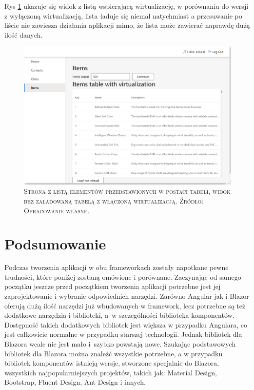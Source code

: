 \documentclass[12pt,a4paper,oneside]{book}
\newcommand{\captionT}[1]{\caption{\textsc{\footnotesize{#1}}}}
\begin{document}
Rys \ref{rys_app_blazor_list_virtual} ukazuje się widok z listą wspierającą wirtualizację, w porównaniu do wersji z wyłączoną wirtualizacją, lista ładuje się niemal natychmiast a przesuwanie po liście nie zawiesza działania aplikacji mimo, że lista może zawierać naprawdę dużą ilość danych.

\begin{figure}[H]
\centering
\includegraphics[width=1\textwidth]{images/BlazorApp/BlazorListaWirtualizacja.pdf}
\captionT{Strona z listą elementów przedstawionych w postaci tabeli, widok bez załadowaną tabelą z włączoną wirtualizacją. Źródło: Opracowanie własne.}
\label{rys_app_blazor_list_virtual}
\end{figure}


\section{Podsumowanie}

Podczas tworzenia aplikacji w obu frameworkach zostały napotkane pewne trudności, które poniżej zostaną omówione i porównane. Zaczynając od samego początku jeszcze przed początkiem tworzenia aplikacji potrzebne jest jej zaprojektowanie i wybranie odpowiednich narzędzi. Zarówno Angular jak i Blazor oferują dużą ilość narzędzi już wbudowanych w framework, lecz potrzebne są też dodatkowe narzędzia i biblioteki, a~w szczególności biblioteka komponentów. Dostępność takich dodatkowych bibliotek jest większa w przypadku Angulara, co jest całkowicie normalne w przypadku starszej technologii. Jednak bibliotek dla Blazora wcale nie jest mało i~szybko powstają nowe. Szukając podstawowych bibliotek dla Blazora można znaleźć wszystkie potrzebne, a w przypadku bibliotek komponentów istnieją wersje, stworzone specjalnie do Blazora, wszystkich najpopularniejszych projektów, takich jak: Material Design, Bootstrap, Fluent Design, Ant Design i innych.
\end{document}
